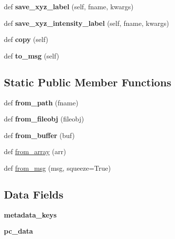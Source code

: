 \begin{DoxyCompactItemize}
def {\bfseries save\+\_\+xyz\+\_\+label} (self, fname, kwargs)
\item 
\mbox{\label{classpypcd__hack_1_1pypcd_1_1PointCloud_a37010541992c42d388d648a958e660a6}} 
def {\bfseries save\+\_\+xyz\+\_\+intensity\+\_\+label} (self, fname, kwargs)
\item 
\mbox{\label{classpypcd__hack_1_1pypcd_1_1PointCloud_ae395119058b9b5d03b58c58aae0e570e}} 
def {\bfseries copy} (self)
\item 
\mbox{\label{classpypcd__hack_1_1pypcd_1_1PointCloud_ad6d7edbc40346baee6137ce53563c6d3}} 
def {\bfseries to\+\_\+msg} (self)
\end{DoxyCompactItemize}
\subsection*{Static Public Member Functions}
\begin{DoxyCompactItemize}
\item 
\mbox{\label{classpypcd__hack_1_1pypcd_1_1PointCloud_a27193e33ac0579cd9cc2d361db65a6c9}} 
def {\bfseries from\+\_\+path} (fname)
\item 
\mbox{\label{classpypcd__hack_1_1pypcd_1_1PointCloud_acf2bd6be80fe14bed220ffb906acd358}} 
def {\bfseries from\+\_\+fileobj} (fileobj)
\item 
\mbox{\label{classpypcd__hack_1_1pypcd_1_1PointCloud_a47a1767739c1d737c32500de1a1f28a0}} 
def {\bfseries from\+\_\+buffer} (buf)
\item 
def \hyperlink{classpypcd__hack_1_1pypcd_1_1PointCloud_acb8878bcd215c21a0000dc0b5c083771}{from\+\_\+array} (arr)
\item 
def \hyperlink{classpypcd__hack_1_1pypcd_1_1PointCloud_aaf05e57c1f81d5f519c45494283082a3}{from\+\_\+msg} (msg, squeeze=True)
\end{DoxyCompactItemize}
\subsection*{Data Fields}
\begin{DoxyCompactItemize}
\item 
\mbox{\label{classpypcd__hack_1_1pypcd_1_1PointCloud_aa2cb255bbb7e2fd96ec54b9d8558b337}} 
{\bfseries metadata\+\_\+keys}
\item 
\mbox{\label{classpypcd__hack_1_1pypcd_1_1PointCloud_ae8e96686e353020aa010fc82f44407c5}} 
{\bfseries pc\+\_\+data}
\end{DoxyCompactItemize}


